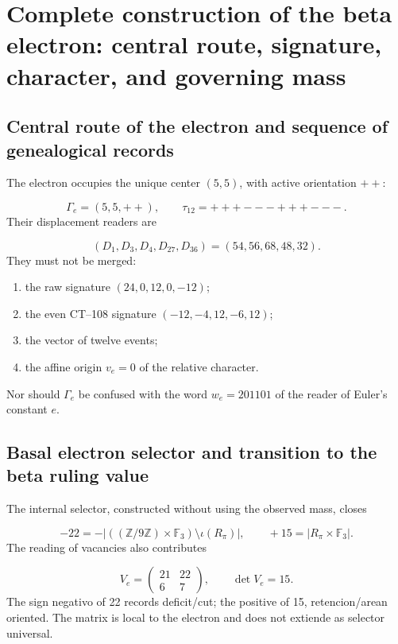 \section{Complete construction of the beta electron: central route, signature, character, and governing mass}
\subsection{Central route of the electron and sequence of genealogical records}
The electron occupies the unique center \((5,5)\), with active orientation \(++\):

\[
 \Gamma_e=(5,5,++),\qquad
 \tau_{12}=+++---+++---.
\]
Their displacement readers are

\[
 (D_1,D_3,D_4,D_{27},D_{36})=(54,56,68,48,32).
\]
They must not be merged:

\begin{enumerate}
\item the raw signature \((24,0,12,0,-12)\);
\item the even CT--108 signature \((-12,-4,12,-6,12)\);
\item the vector of twelve events;
\item the affine origin \(v_e=0\) of the relative character.
\end{enumerate}
Nor should \(\Gamma_e\) be confused with the word \(w_e=201101\) of the reader of Euler's constant \(e\).

\subsection{Basal electron selector and transition to the beta ruling value}
The internal selector, constructed without using the observed mass, closes

\[
 -22=-\left|((\mathbb Z/9\mathbb Z)\times\mathbb F_3)\setminus\iota(R_\pi)\right|,
 \qquad
 +15=|R_\pi\times\mathbb F_3|.
\]
The reading of vacancies also contributes

\[
 V_e=\begin{pmatrix}21&22\\6&7\end{pmatrix},\qquad
 \det V_e=15.
\]
The sign negativo of 22 records deficit/cut; the positive of 15, retencion/arean oriented. The matrix is local to the electron and does not  extiende as selector universal.

